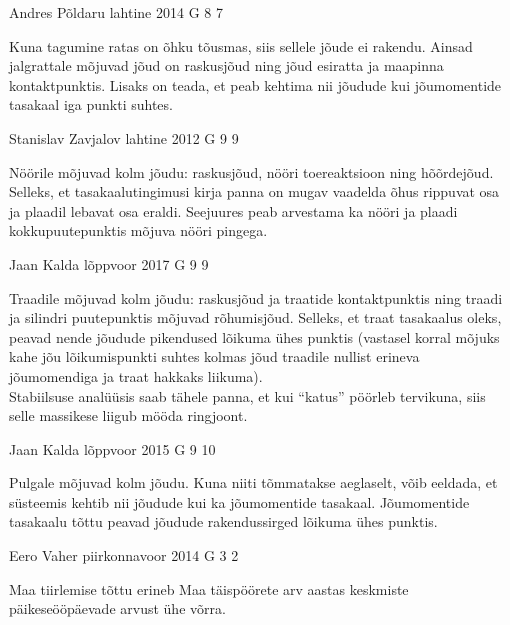 \documentclass[11pt, twoside]{article}
\begin{document}
{%
{Andres Põldaru} %
{lahtine} %
{2014} %
{G 8} %
{7} %
{

\ifHint
Kuna tagumine ratas on õhku tõusmas, siis sellele jõude ei rakendu. Ainsad jalgrattale mõjuvad jõud on raskusjõud ning jõud esiratta ja maapinna kontaktpunktis. Lisaks on teada, et peab kehtima nii jõudude kui jõumomentide tasakaal iga punkti suhtes.
\fi
}

{Stanislav Zavjalov} %
{lahtine} %
{2012} %
{G 9} %
{9} %
{

\ifHint
Nöörile mõjuvad kolm jõudu: raskusjõud, nööri toereaktsioon ning hõõrdejõud. Selleks, et tasakaalutingimusi kirja panna on mugav vaadelda õhus rippuvat osa ja plaadil lebavat osa eraldi. Seejuures peab arvestama ka nööri ja plaadi kokkupuutepunktis mõjuva nööri pingega.
\fi
}

{Jaan Kalda} %
{lõppvoor} %
{2017} %
{G 9} %
{9} %
{

\ifHint
Traadile mõjuvad kolm jõudu: raskusjõud ja traatide kontaktpunktis ning traadi ja silindri puutepunktis mõjuvad rõhumisjõud. Selleks, et traat tasakaalus oleks, peavad nende jõudude pikendused lõikuma ühes punktis (vastasel korral mõjuks kahe jõu lõikumispunkti suhtes kolmas jõud traadile nullist erineva jõumomendiga ja traat hakkaks liikuma).\\
Stabiilsuse analüüsis saab tähele panna, et kui \enquote{katus} pöörleb tervikuna, siis selle massikese liigub mööda ringjoont.
\fi
}

{Jaan Kalda} %
{lõppvoor} %
{2015} %
{G 9} %
{10} %
{

\ifHint
Pulgale mõjuvad kolm jõudu. Kuna niiti tõmmatakse aeglaselt, võib eeldada, et süsteemis kehtib nii jõudude kui ka jõumomentide tasakaal. Jõumomentide tasakaalu tõttu peavad jõudude rakendussirged lõikuma ühes punktis.
\fi
}

{Eero Vaher} %
{piirkonnavoor} %
{2014} %
{G 3} %
{2} %
{

\ifHint
Maa tiirlemise tõttu erineb Maa täispöörete arv aastas keskmiste päikeseööpäevade arvust ühe võrra.
\fi
}

}
\end{document}
